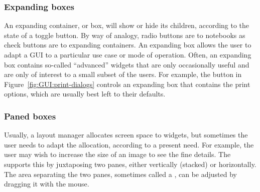

\subsubsection{Expanding boxes}
\label{sec:GUI:expanding-boxes}

An expanding container, or box, will show or hide its children, according to the
state of a toggle button. By way of analogy, radio buttons are to
notebooks as check buttons are to expanding containers. An expanding box
allows the user to adapt a GUI to a particular use case or mode of
operation. Often, an expanding box contains so-called ``advanced''
widgets that are only occasionally useful and are only of interest to
a small subset of the users. For example, the  button in
Figure~\ref{fig:GUI:print-dialogs} controls an expanding box that
contains the print options, which are usually best left to their
defaults.

\subsubsection{Paned boxes}
\label{sec:GUI:paned-boxes}

Usually, a layout manager allocates screen space to widgets, but
sometimes the user needs to adapt the allocation, according to a
present need. For example, the user may wish to increase the size of
an image to see the fine details. The 
supports this by juxtaposing two panes, either vertically (stacked) or
horizontally. The area separating the two panes, sometimes called a
, can be adjusted by dragging it with the mouse.
   
